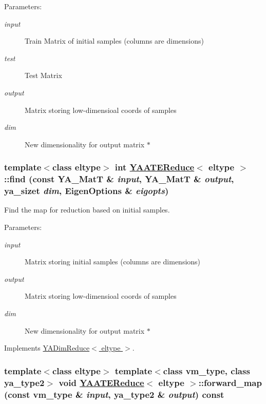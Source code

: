 \begin{Desc}
\item[Parameters:]
\begin{description}
\item[{\em input}]Train Matrix of initial samples (columns are dimensions) \item[{\em test}]Test Matrix \item[{\em output}]Matrix storing low-dimensioal coords of samples \item[{\em dim}]New dimensionality for output matrix $\ast$ \end{description}
\end{Desc}
\hypertarget{class_y_a_a_t_e_reduce_a5}{
\subsubsection[find]{\setlength{\rightskip}{0pt plus 5cm}template$<$class eltype$>$ int \hyperlink{class_y_a_a_t_e_reduce}{YAATEReduce}$<$ eltype $>$::find (const YA\_\-Mat\-T \& {\em input}, YA\_\-Mat\-T \& {\em output}, ya\_\-sizet {\em dim}, Eigen\-Options \& {\em eigopts})}}
\label{class_y_a_a_t_e_reduce_a5}


Find the map for reduction based on initial samples. 

\begin{Desc}
\item[Parameters:]
\begin{description}
\item[{\em input}]Matrix storing initial samples (columns are dimensions) \item[{\em output}]Matrix storing low-dimensioal coords of samples \item[{\em dim}]New dimensionality for output matrix $\ast$ \end{description}
\end{Desc}


Implements \hyperlink{class_y_a_dim_reduce_a8}{YADim\-Reduce$<$ eltype $>$}.\hypertarget{class_y_a_a_t_e_reduce_a14}{
\subsubsection[forward\_\-map]{\setlength{\rightskip}{0pt plus 5cm}template$<$class eltype$>$ template$<$class vm\_\-type, class ya\_\-type2$>$ void \hyperlink{class_y_a_a_t_e_reduce}{YAATEReduce}$<$ eltype $>$::forward\_\-map (const vm\_\-type \& {\em input}, ya\_\-type2 \& {\em output}) const}}
\label{class_y_a_a_t_e_reduce_a14}


